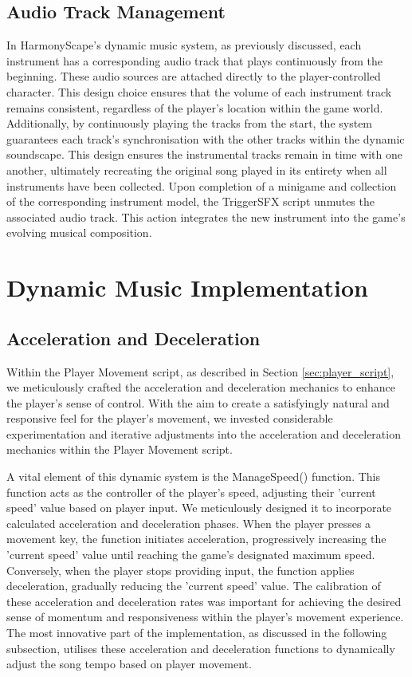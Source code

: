 \documentclass{l4proj}
\begin{document}
\subsection{Audio Track Management}
In HarmonyScape's dynamic music system, as previously discussed, each instrument has a corresponding audio track that plays continuously from the beginning. These audio sources are attached directly to the player-controlled character. This design choice ensures that the volume of each instrument track remains consistent, regardless of the player's location within the game world.  Additionally, by continuously playing the tracks from the start, the system guarantees each track's synchronisation with the other tracks within the dynamic soundscape. This design ensures the instrumental tracks remain in time with one another, ultimately recreating the original song played in its entirety when all instruments have been collected. Upon completion of a minigame and collection of the corresponding instrument model, the TriggerSFX script unmutes the associated audio track. This action integrates the new instrument into the game's evolving musical composition.

\section{Dynamic Music Implementation}

\subsection{Acceleration and Deceleration}
Within the Player Movement script, as described in Section \ref{sec:player_script}, we meticulously crafted the acceleration and deceleration mechanics to enhance the player's sense of control. With the aim to create a satisfyingly natural and responsive feel for the player's movement, we invested considerable experimentation and iterative adjustments into the acceleration and deceleration mechanics within the Player Movement script.

A vital element of this dynamic system is the ManageSpeed() function. This function acts as the controller of the player's speed, adjusting their 'current speed' value based on player input. We meticulously designed it to incorporate calculated acceleration and deceleration phases. When the player presses a movement key, the function initiates acceleration, progressively increasing the 'current speed' value until reaching the game's designated maximum speed. Conversely, when the player stops providing input, the function applies deceleration, gradually reducing the 'current speed' value. The calibration of these acceleration and deceleration rates was important for achieving the desired sense of momentum and responsiveness within the player's movement experience. The most innovative part of the implementation, as discussed in the following subsection, utilises these acceleration and deceleration functions to dynamically adjust the song tempo based on player movement.
\end{document}
